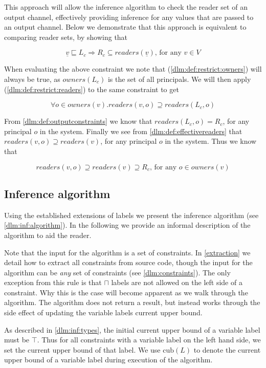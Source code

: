 This approach will allow the inference algorithm to check the reader set of an output channel, effectively providing inference for any values that are passed to an output channel.
Below we demonstrate that this approach is equivalent to comparing reader sets, by showing that

\[ \underline{v} \sqsubseteq L_c \Rightarrow R_c \subseteq readers(\underline{v}) \text{, for any } v \in V \]

When evaluating the above constraint we note that (\ref{dlm:def:restrict:owners}) will always be true, as $owners(L_c)$ is the set of all principals.
We will then apply (\ref{dlm:def:restrict:readers}) to the same constraint to get

\[ \forall o \in owners(v) . readers(v, o) \supseteq readers(L_c, o) \]

From \cref{dlm:def:outputconstraints} we know that $readers(L_c, o) = R_c$, for any principal $o$ in the system.
Finally we see from \cref{dlm:def:effectivereaders} that $readers(v, o) \supseteq readers(v)$, for any principal $o$ in the system.
Thus we know that

\[ readers(v, o) \supseteq readers(v) \supseteq R_c \text{, for any } o \in owners(v) \]

\subsection{Inference algorithm}\label{dlm:inf:algsection}
Using the established extensions of labels we present the inference algorithm (see \cref{dlm:inf:algorithm}).
In the following we provide an informal description of the algorithm to aid the reader.

Note that the input for the algorithm is a set of constraints.
In \cref{extraction} we detail how to extract all constraints from source code, though the input for the algorithm can be \textit{any} set of constraints (see \cref{dlm:constraints}).
The only exception from this rule is that $\sqcap$ labels are not allowed on the left side of a constraint.
Why this is the case will become apparent as we walk through the algorithm.
The algorithm does not return a result, but instead works through the side effect of updating the variable labels current upper bound.



As described in \cref{dlm:inf:types}, the initial current upper bound of a variable label must be $\top$.
Thus for all constraints with a variable label on the left hand side, we set the current upper bound of that label.
We use $\text{cub}(L)$ to denote the current upper bound of a variable label during execution of the algorithm.

